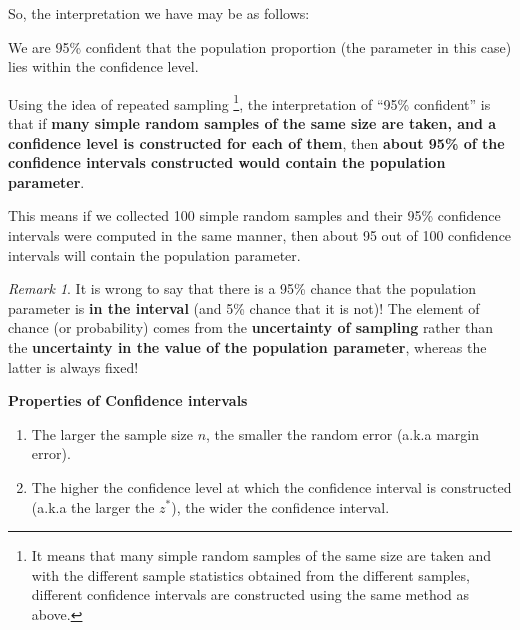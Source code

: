 \documentclass[math,code]{amznotes}
\theoremstyle{remark}
\newtheorem*{remark}{Remark}
\begin{document}
So, the interpretation we have may be as follows:
\begin{center}
    We are 95\% confident that the population proportion (the parameter in this case) lies within the confidence level.
\end{center}
Using the idea of repeated sampling \footnote{It means that many simple random samples of the same size are taken and with the different sample statistics obtained from the different samples, different confidence intervals are constructed using the same method as above.}, the interpretation of ``95\% confident'' is that if \textbf{many simple random samples of the same size are taken, and a confidence level is constructed for each of them}, then \textbf{about 95\% of the confidence intervals constructed would contain the population parameter}.

This means if we collected 100 simple random samples and their 95\% confidence intervals were computed in the same manner, then about 95 out of 100 confidence intervals will contain the population parameter.
\begin{notebox}
    \begin{remark}
        It is wrong to say that there is a 95\% chance that the population parameter is \textbf{in the interval} (and 5\% chance that it is not)! The element of chance (or probability) comes from the \textbf{uncertainty of sampling} rather than the \textbf{uncertainty in the value of the population parameter}, whereas the latter is always fixed!
    \end{remark}
\end{notebox}
\textbf{Properties of Confidence intervals}
\begin{enumerate}
    \item The larger the sample size $n$, the smaller the random error (a.k.a margin error).
    \item The higher the confidence level at which the confidence interval is constructed (a.k.a the larger the $z^*$), the wider the confidence interval.
\end{enumerate}
\end{document}

